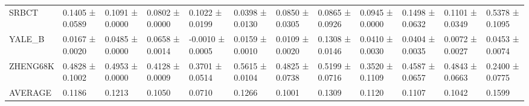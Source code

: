 \begin{tabular}{llllllllllll}
SRBCT & 0.1405 ± 0.0589 & 0.1091 ± 0.0000 & 0.0802 ± 0.0000 & 0.1022 ± 0.0199 & 0.0398 ± 0.0130 & 0.0850 ± 0.0305 & 0.0865 ± 0.0926 & 0.0945 ± 0.0000 & 0.1498 ± 0.0632 & 0.1101 ± 0.0349 & 0.5378 ± 0.1095 \\
YALE_B & 0.0167 ± 0.0020 & 0.0485 ± 0.0000 & 0.0658 ± 0.0014 & -0.0010 ± 0.0005 & 0.0159 ± 0.0010 & 0.0109 ± 0.0020 & 0.1308 ± 0.0146 & 0.0410 ± 0.0030 & 0.0404 ± 0.0035 & 0.0072 ± 0.0027 & 0.0453 ± 0.0074 \\
ZHENG68K & 0.4828 ± 0.1002 & 0.4953 ± 0.0000 & 0.4128 ± 0.0009 & 0.3701 ± 0.0514 & 0.5615 ± 0.0104 & 0.4825 ± 0.0738 & 0.5199 ± 0.0716 & 0.3520 ± 0.1109 & 0.4587 ± 0.0657 & 0.4843 ± 0.0663 & 0.2400 ± 0.0775 \\
AVERAGE & 0.1186 & 0.1213 & 0.1050 & 0.0710 & 0.1266 & 0.1001 & 0.1309 & 0.1120 & 0.1107 & 0.1042 & 0.1599 \\
\bottomrule
\end{tabular}

